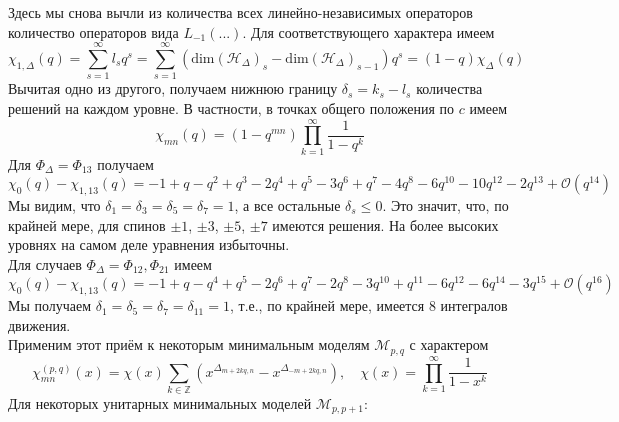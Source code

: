 \documentclass[12pt]{article}
\theoremstyle{definition}
\begin{document}
Здесь мы снова вычли из количества всех линейно-независимых операторов количество операторов вида $L_{-1}(...)$. Для соответствующего характера имеем
\begin{equation}
    \chi_{1,\Delta}(q)=\sum\limits_{s=1}^\infty l_sq^s=\sum\limits_{s=1}^\infty(\text{dim}(\mathcal{H}_\Delta)_s-\text{dim}(\mathcal{H}_\Delta)_{s-1})q^s=(1-q)\chi_\Delta(q)
\end{equation}
Вычитая одно из другого, получаем нижнюю границу $\delta_s = k_s-l_s$ количества решений на каждом уровне. В частности, в точках общего положения по $c$ имеем
\begin{equation}
    \chi_{mn}(q)=(1-q^{mn})\prod\limits_{k=1}^\infty\frac{1}{1-q^k}
\end{equation}
Для $\Phi_\Delta =\Phi_{13}$ получаем
\begin{equation}
    \chi_0(q)-\chi_{1,13}(q)=-1+q-q^2+q^3-2q^4+q^5-3q^6+q^7-4q^8-6q^{10}-10q^{12}-2q^{13}+\mathcal{O}(q^{14})
\end{equation}
Мы видим, что $\delta_1 = \delta_3 = \delta_5 = \delta_7 = 1$, а все остальные $\delta_s \leq 0$. Это значит, что, по крайней мере, для спинов $\pm1$, $\pm3$, $\pm5$, $\pm7$ имеются решения. На более высоких уровнях на самом деле уравнения избыточны.\\
Для случаев $\Phi_\Delta = \Phi_{12}, \Phi_{21}$ имеем
\begin{equation}
    \chi_0(q)-\chi_{1,13}(q)=-1+q-q^4+q^5-2q^6+q^7-2q^8-3q^{10}+q^{11}-6q^{12}-6q^{14}-3q^{15}+\mathcal{O}(q^{16})
\end{equation}
Мы получаем $\delta_1=\delta_5=\delta_7=\delta_{11}=1$, т.е., по крайней мере, имеется 8 интегралов движения.\\
Применим этот приём к некоторым минимальным моделям $\mathcal{M}_{p,q}$ с характером 
\begin{equation}
    \chi_{mn}^{(p,q)}(x)=\chi(x)\sum\limits_{k\in\mathbb{Z}}(x^{\Delta_{m+2kq,n}}-x^{\Delta_{-m+2kq,n}}),\quad\chi(x)=\prod\limits_{k=1}^\infty\frac{1}{1-x^k}
\end{equation}
Для некоторых унитарных минимальных моделей $\mathcal{M}_{p,p+1}$:
\end{document}
